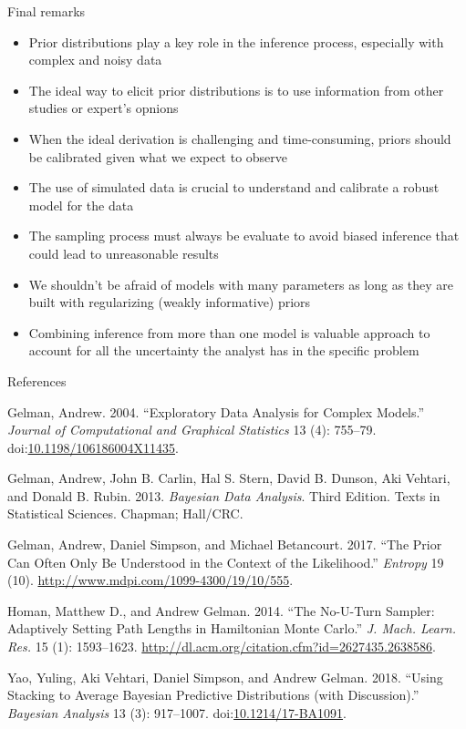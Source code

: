 \documentclass[ignorenonframetext,a4paper]{beamer}
\begin{document}
\begin{frame}{Final remarks}

\footnotesize

\begin{itemize}
  \item{Prior distributions play a key role in the inference process,
        especially with complex and noisy data}
  \item{The ideal way to elicit prior distributions is to use 
        information from other studies or expert's opnions}
  \item{When the ideal derivation is challenging and time-consuming,
        priors should be calibrated given what we expect to observe}
  \item{The use of simulated data is crucial to understand and 
        calibrate a robust model for the data}
  \item{The sampling process must always be evaluate to avoid biased
        inference that could lead to unreasonable results}
  \item{We shouldn't be afraid of models with many parameters as long
        as they are built with regularizing (weakly informative) priors}
  \item{Combining inference from more than one model is valuable 
        approach to account for all the uncertainty the analyst has in
        the specific problem}
\end{itemize}

\end{frame}

\begin{frame}{References}

\scriptsize

\hypertarget{refs}{}
\hypertarget{ref-gelman_2004}{}
Gelman, Andrew. 2004. ``Exploratory Data Analysis for Complex Models.''
\emph{Journal of Computational and Graphical Statistics} 13 (4):
755--79.
doi:\href{https://doi.org/10.1198/106186004X11435}{10.1198/106186004X11435}.

\hypertarget{ref-gelman_2013}{}
Gelman, Andrew, John B. Carlin, Hal S. Stern, David B. Dunson, Aki
Vehtari, and Donald B. Rubin. 2013. \emph{Bayesian Data Analysis}. Third
Edition. Texts in Statistical Sciences. Chapman; Hall/CRC.

\hypertarget{ref-gelman_2017}{}
Gelman, Andrew, Daniel Simpson, and Michael Betancourt. 2017. ``The
Prior Can Often Only Be Understood in the Context of the Likelihood.''
\emph{Entropy} 19 (10). \url{http://www.mdpi.com/1099-4300/19/10/555}.

\hypertarget{ref-hoffman_2014}{}
Homan, Matthew D., and Andrew Gelman. 2014. ``The No-U-Turn Sampler:
Adaptively Setting Path Lengths in Hamiltonian Monte Carlo.'' \emph{J.
Mach. Learn. Res.} 15 (1): 1593--1623.
\url{http://dl.acm.org/citation.cfm?id=2627435.2638586}.

\hypertarget{ref-yao_2018}{}
Yao, Yuling, Aki Vehtari, Daniel Simpson, and Andrew Gelman. 2018.
``Using Stacking to Average Bayesian Predictive Distributions (with
Discussion).'' \emph{Bayesian Analysis} 13 (3): 917--1007.
doi:\href{https://doi.org/10.1214/17-BA1091}{10.1214/17-BA1091}.

\end{frame}
\end{document}
